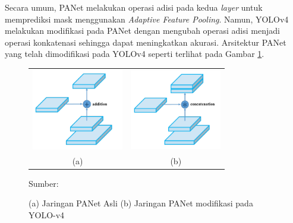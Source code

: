 \begin{enumerate}
        Secara umum, PANet melakukan operasi adisi pada kedua \textit{layer} untuk memprediksi mask menggunakan \textit{Adaptive Feature Pooling}. Namun, YOLOv4 melakukan modifikasi pada PANet dengan mengubah operasi adisi menjadi operasi konkatenasi sehingga dapat meningkatkan akurasi. Arsitektur PANet yang telah dimodifikasi pada YOLOv4 seperti terlihat pada Gambar \ref{fig:panet}.

        \begin{figure}[H]
            \centering
            \begin{tabular}{cc}
                \includegraphics[width=4cm]{../img/PANet Original - Latex.PNG}
                &
                \includegraphics[width=4cm]{../img/PANet Modified - Latex.PNG}\\
                (a) &(b)\\
            \end{tabular}
            \caption{(a) Jaringan PANet Asli (b) Jaringan PANet modifikasi pada YOLO-v4}
            \label{fig:panet}
            Sumber: \citep{Bochkovskiy2020}
        \end{figure}

    \end{enumerate}



